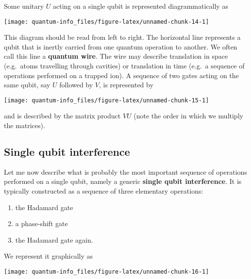 \documentclass[fleqn]{article}
\providecommand{\tightlist}{%
  \setlength{\itemsep}{0pt}\setlength{\parskip}{0pt}}
\begin{document}
Some unitary \(U\) acting on a single qubit is represented diagrammatically as

\begin{center}\texttt{[image: quantum-info\_files/figure-latex/unnamed-chunk-14-1]} \end{center}

This diagram should be read from left to right.
The horizontal line represents a qubit that is inertly carried from one quantum operation to another.
We often call this line a \textbf{quantum wire}.
The wire may describe translation in space (e.g.~atoms travelling through cavities) or translation in time (e.g.~a sequence of operations performed on a trapped ion).
A sequence of two gates acting on the same qubit, say \(U\) followed by \(V\), is represented by

\begin{center}\texttt{[image: quantum-info\_files/figure-latex/unnamed-chunk-15-1]} \end{center}

and is described by the matrix product \(VU\) (note the order in which we multiply the matrices).

\hypertarget{single-qubit-interference}{%
\subsection{Single qubit interference}\label{single-qubit-interference}}

Let me now describe what is probably the most important sequence of operations performed on a single qubit, namely a generic \textbf{single qubit interference}.
It is typically constructed as a sequence of three elementary operations:

\begin{enumerate}
\def\labelenumi{\arabic{enumi}.}
\tightlist
\item
  the Hadamard gate
\item
  a phase-shift gate
\item
  the Hadamard gate again.
\end{enumerate}

We represent it graphically as

\begin{center}\texttt{[image: quantum-info\_files/figure-latex/unnamed-chunk-16-1]} \end{center}
\end{document}
